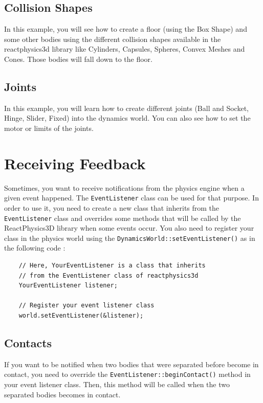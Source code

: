 \documentclass[a4paper,12pt]{article}
\begin{document}
    \subsection{Collision Shapes}

    In this example, you will see how to create a floor (using the Box Shape) and some other bodies using the different collision shapes available
    in the reactphysics3d library like Cylinders, Capsules, Spheres, Convex Meshes and Cones. Those bodies will fall down to the floor.

    \subsection{Joints}

    In this example, you will learn how to create different joints (Ball and Socket, Hinge, Slider, Fixed) into the dynamics world. You can also see how
    to set the motor or limits of the joints.

    \section{Receiving Feedback}

    Sometimes, you want to receive notifications from the physics engine when a given event happened. The \texttt{EventListener} class can be used for that purpose. In order to use
    it, you need to create a new class that inherits from the \texttt{EventListener} class and overrides some methods that will be called by the ReactPhysics3D library when some events
    occur. You also need to register your class in the physics world using the \texttt{DynamicsWorld::setEventListener()} as in the following code : \\

    \begin{lstlisting}
    // Here, YourEventListener is a class that inherits
    // from the EventListener class of reactphysics3d
    YourEventListener listener;

    // Register your event listener class
    world.setEventListener(&listener);
  \end{lstlisting}

    \subsection{Contacts}

   If you want to be notified when two bodies that were separated before become in contact, you need to override the \texttt{EventListener::beginContact()} method in your event
   listener class. Then, this method will be called when the two separated bodies becomes in contact. \\
\end{document}
